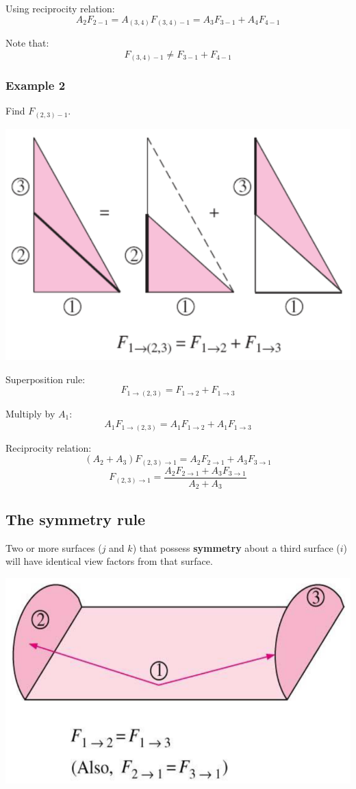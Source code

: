\documentclass[11pt]{article}
\begin{document}
Using reciprocity relation:
\[A_2 F_{2-1} = A_{(3, 4)} F_{(3, 4)-1} = A_3 F_{3-1} + A_4 F_{4-1}\]

Note that:
\[F_{(3, 4)-1} \ne F_{3-1} + F_{4-1}\]

 \newpage
\subsubsection{Example 2}
\label{sec:org38e4000}
Find \(F_{(2, 3)-1}\).
\begin{center}
\includegraphics[width=.9\linewidth]{./images/superposition-rule-diagram.png}
\end{center}

Superposition rule:
\[F_{1 \rightarrow (2, 3)} = F_{1 \rightarrow 2} + F_{1 \rightarrow 3}\]

Multiply by \(A_1\):
\[A_1 F_{1 \rightarrow (2, 3)} = A_1 F_{1 \rightarrow 2} + A_1 F_{1 \rightarrow 3}\]

Reciprocity relation:
\[(A_2 + A_3) F_{(2, 3) \rightarrow 1} = A_2 F_{2 \rightarrow 1} + A_3 F_{3 \rightarrow 1}\]
\[F_{(2, 3) \rightarrow 1} = \frac{A_2 F_{2 \rightarrow 1} + A_3 F_{3 \rightarrow 1}}{A_2 + A_3}\]

 \newpage
\subsection{The symmetry rule}
\label{sec:org916bf77}
Two or more surfaces (\(j\) and \(k\)) that possess \textbf{symmetry} about a third surface (\(i\)) will have identical view factors from that surface.
\begin{center}
\includegraphics[width=.9\linewidth]{./images/symmetry-rule-diagram.png}
\end{center}
\end{document}
